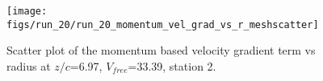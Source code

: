 \begin{figure}[H]
\centering
\texttt{[image: figs/run\_20/run\_20\_momentum\_vel\_grad\_vs\_r\_meshscatter]}
\caption{Scatter plot of the momentum based velocity gradient term vs radius at $z/c$=6.97, $V_{free}$=33.39, station 2.}
\label{fig:run_20_momentum_vel_grad_vs_r_meshscatter}
\end{figure}


